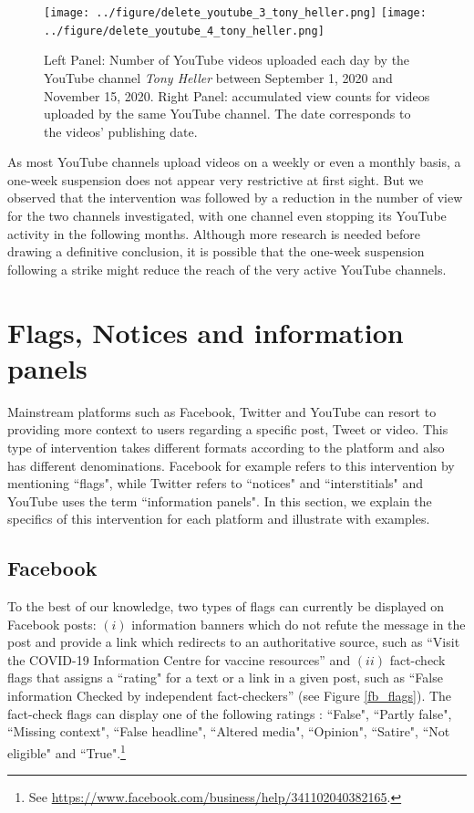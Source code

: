 \documentclass{article}
\begin{document}
\begin{figure}[h]
\hspace{-2em}
			\texttt{[image: ../figure/delete\_youtube\_3\_tony\_heller.png]}
			\texttt{[image: ../figure/delete\_youtube\_4\_tony\_heller.png]}
	\caption{Left Panel: Number of YouTube videos uploaded each day by the YouTube channel {\it Tony Heller} between September 1, 2020 and November 15, 2020. Right Panel: accumulated view counts for videos uploaded by the same YouTube channel. The date corresponds to the videos’  publishing date. 
}
	\label{delete_youtube_tony}
\end{figure}

\smallskip

As most YouTube channels upload videos on a weekly or even a monthly basis, a one-week suspension does not appear very restrictive at first sight. 
But we observed that the intervention was followed by a reduction in the number of view for the two channels investigated, with one channel even stopping its YouTube activity in the following months. 
Although more research is needed before drawing a definitive conclusion, it is possible that the one-week suspension following a strike might reduce the reach of the very active YouTube channels.


\section{Flags, Notices and information panels} \label{flags}

Mainstream platforms such as Facebook, Twitter and YouTube can resort to providing more context to users regarding a specific post, Tweet or video. This type of intervention takes different formats according to the platform and also has different denominations. Facebook for example refers to this intervention by mentioning ``flags", while Twitter  refers to ``notices" and ``interstitials" and YouTube uses the term ``information panels". In this section, we explain the specifics of this intervention for each platform and illustrate with examples. 

\subsection{Facebook}

To the best of our knowledge, two types of flags can currently be displayed on Facebook posts: 
$(i)$ information banners which do not refute the message in the post and provide a link which redirects to an authoritative source, such as ``Visit the COVID-19 Information Centre for vaccine resources'' and $(ii)$ fact-check flags that assigns a ``rating" for a text or a link in a given post, such as ``False information Checked by independent fact-checkers'' (see Figure \ref{fb_flags}). The fact-check flags can display one of the following ratings : ``False", ``Partly false", ``Missing context", ``False headline", ``Altered media", ``Opinion", ``Satire", ``Not eligible" and ``True".\footnote{See \href{https://www.facebook.com/business/help/341102040382165}{https://www.facebook.com/business/help/341102040382165}.}
\end{document}
